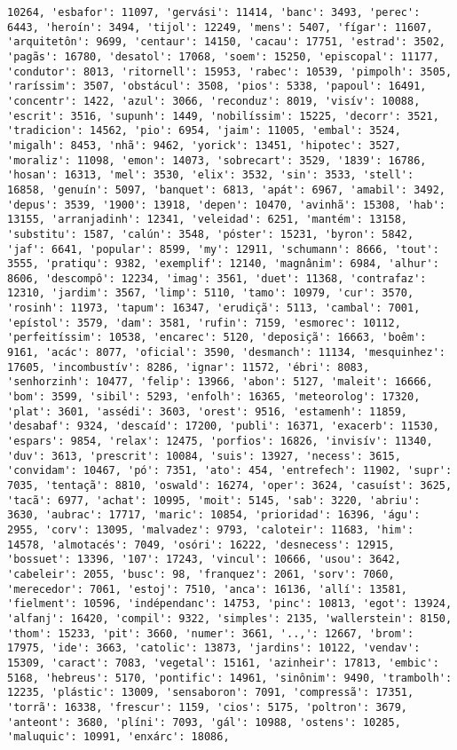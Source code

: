 \documentclass[11pt]{article}
\begin{document}
\begin{Verbatim}[commandchars=\\\{\}]
10264, 'esbafor': 11097, 'gervási': 11414, 'banc': 3493, 'perec': 6443, 'heroín': 3494, 'tijol': 12249, 'mens': 5407, 'fígar': 11607, 'arquitetôn': 9699, 'centaur': 14150, 'cacau': 17751, 'estrad': 3502, 'pagãs': 16780, 'desatol': 17068, 'soem': 15250, 'episcopal': 11177, 'condutor': 8013, 'ritornell': 15953, 'rabec': 10539, 'pimpolh': 3505, 'raríssim': 3507, 'obstácul': 3508, 'pios': 5338, 'papoul': 16491, 'concentr': 1422, 'azul': 3066, 'reconduz': 8019, 'visív': 10088, 'escrit': 3516, 'supunh': 1449, 'nobilíssim': 15225, 'decorr': 3521, 'tradicion': 14562, 'pio': 6954, 'jaim': 11005, 'embal': 3524, 'migalh': 8453, 'nhã': 9462, 'yorick': 13451, 'hipotec': 3527, 'moraliz': 11098, 'emon': 14073, 'sobrecart': 3529, '1839': 16786, 'hosan': 16313, 'mel': 3530, 'elix': 3532, 'sin': 3533, 'stell': 16858, 'genuín': 5097, 'banquet': 6813, 'apát': 6967, 'amabil': 3492, 'depus': 3539, '1900': 13918, 'depen': 10470, 'avinhã': 15308, 'hab': 13155, 'arranjadinh': 12341, 'veleidad': 6251, 'mantém': 13158, 'substitu': 1587, 'calún': 3548, 'póster': 15231, 'byron': 5842, 'jaf': 6641, 'popular': 8599, 'my': 12911, 'schumann': 8666, 'tout': 3555, 'pratiqu': 9382, 'exemplif': 12140, 'magnânim': 6984, 'alhur': 8606, 'descompô': 12234, 'imag': 3561, 'duet': 11368, 'contrafaz': 12310, 'jardim': 3567, 'limp': 5110, 'tamo': 10979, 'cur': 3570, 'rosinh': 11973, 'tapum': 16347, 'erudiçã': 5113, 'cambal': 7001, 'epístol': 3579, 'dam': 3581, 'rufin': 7159, 'esmorec': 10112, 'perfeitíssim': 10538, 'encarec': 5120, 'deposiçã': 16663, 'boêm': 9161, 'acác': 8077, 'oficial': 3590, 'desmanch': 11134, 'mesquinhez': 17605, 'incombustív': 8286, 'ignar': 11572, 'ébri': 8083, 'senhorzinh': 10477, 'felip': 13966, 'abon': 5127, 'maleit': 16666, 'bom': 3599, 'sibil': 5293, 'enfolh': 16365, 'meteorolog': 17320, 'plat': 3601, 'assédi': 3603, 'orest': 9516, 'estamenh': 11859, 'desabaf': 9324, 'descaíd': 17200, 'publi': 16371, 'exacerb': 11530, 'espars': 9854, 'relax': 12475, 'porfios': 16826, 'invisív': 11340, 'duv': 3613, 'prescrit': 10084, 'suis': 13927, 'necess': 3615, 'convidam': 10467, 'pó': 7351, 'ato': 454, 'entrefech': 11902, 'supr': 7035, 'tentaçã': 8810, 'oswald': 16274, 'oper': 3624, 'casuíst': 3625, 'tacã': 6977, 'achat': 10995, 'moit': 5145, 'sab': 3220, 'abriu': 3630, 'aubrac': 17717, 'maric': 10854, 'prioridad': 16396, 'águ': 2955, 'corv': 13095, 'malvadez': 9793, 'caloteir': 11683, 'him': 14578, 'almotacés': 7049, 'osóri': 16222, 'desnecess': 12915, 'bossuet': 13396, '107': 17243, 'vincul': 10666, 'usou': 3642, 'cabeleir': 2055, 'busc': 98, 'franquez': 2061, 'sorv': 7060, 'merecedor': 7061, 'estoj': 7510, 'anca': 16136, 'allí': 13581, 'fielment': 10596, 'indépendanc': 14753, 'pinc': 10813, 'egot': 13924, 'alfanj': 16420, 'compil': 9322, 'simples': 2135, 'wallerstein': 8150, 'thom': 15233, 'pit': 3660, 'numer': 3661, '..,': 12667, 'brom': 17975, 'ide': 3663, 'catolic': 13873, 'jardins': 10122, 'vendav': 15309, 'caract': 7083, 'vegetal': 15161, 'azinheir': 17813, 'embic': 5168, 'hebreus': 5170, 'pontific': 14961, 'sinônim': 9490, 'trambolh': 12235, 'plástic': 13009, 'sensaboron': 7091, 'compressã': 17351, 'torrã': 16338, 'frescur': 1159, 'cios': 5175, 'poltron': 3679, 'anteont': 3680, 'plíni': 7093, 'gál': 10988, 'ostens': 10285, 'maluquic': 10991, 'enxárc': 18086, 
\end{Verbatim}
\end{document}
